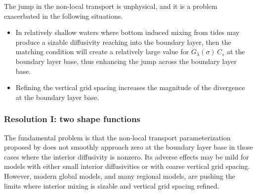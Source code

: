 The jump in the non-local transport is unphysical, and it is a problem
exacerbated in the following situations.
\begin{itemize}

\item In relatively shallow waters where bottom induced mixing from
  tides may produce a sizable diffusivity reaching into the boundary
  layer, then the matching condition will create a relatively large
  value for $G_{\lambda}(\sigma) \, C_{s}$ at the boundary layer base,
  thus enhancing the jump across the boundary layer base. 

\item Refining the vertical grid spacing increases the magnitude of
  the divergence at the boundary layer base.

\end{itemize}


\subsubsection{Resolution I: two shape functions}

The fundamental problem is that the non-local transport
parameterization proposed by \cite{LargeKPP} does not smoothly
approach zero at the boundary layer base in those cases where the
interior diffusivity is nonzero.  Its adverse effects may be mild for
models with either small interior diffusivities or with coarse
vertical grid spacing.  However, modern global models, and many
regional models, are pushing the limits where interior mixing is
sizable and vertical grid spacing refined.

